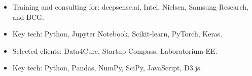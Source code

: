\documentclass[10pt,a4paper,ragged2e,withhyper]{altacv}
\begin{document}
\begin{paracol}{2}
\divider

\begin{itemize}
\item Training and consulting for: deepsense.ai, Intel, Nielsen, Samsung Research, and BCG.
\item Key tech: Python, Jupyter Notebook, Scikit-learn, PyTorch, Keras.
\end{itemize}

\divider

\begin{itemize}
\item Selected clients: Data4Cure, Startup Compass, Laboratorium EE.
\item Key tech: Python, Pandas, NumPy, SciPy, JavaScript, D3.js.
\end{itemize}








\end{paracol}
\end{document}
